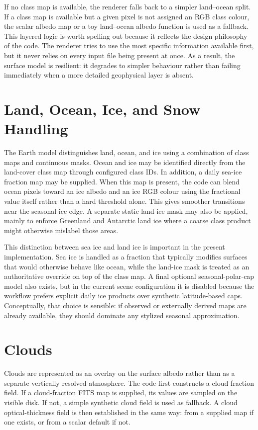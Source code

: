 \documentclass[12pt,a4paper]{article}
\begin{document}
If no class map is available, the renderer falls back to a simpler land--ocean split. If a class map is available but a given pixel is not assigned an RGB class colour, the scalar albedo map or a toy land--ocean albedo function is used as a fallback. This layered logic is worth spelling out because it reflects the design philosophy of the code. The renderer tries to use the most specific information available first, but it never relies on every input file being present at once. As a result, the surface model is resilient: it degrades to simpler behaviour rather than failing immediately when a more detailed geophysical layer is absent.

\section{Land, Ocean, Ice, and Snow Handling}
The Earth model distinguishes land, ocean, and ice using a combination of class maps and continuous masks. Ocean and ice may be identified directly from the land-cover class map through configured class IDs. In addition, a daily sea-ice fraction map may be supplied. When this map is present, the code can blend ocean pixels toward an ice albedo and an ice RGB colour using the fractional value itself rather than a hard threshold alone. This gives smoother transitions near the seasonal ice edge. A separate static land-ice mask may also be applied, mainly to enforce Greenland and Antarctic land ice where a coarse class product might otherwise mislabel those areas.

This distinction between sea ice and land ice is important in the present implementation. Sea ice is handled as a fraction that typically modifies surfaces that would otherwise behave like ocean, while the land-ice mask is treated as an authoritative override on top of the class map. A final optional seasonal-polar-cap model also exists, but in the current scene configuration it is disabled because the workflow prefers explicit daily ice products over synthetic latitude-based caps. Conceptually, that choice is sensible: if observed or externally derived maps are already available, they should dominate any stylized seasonal approximation.

\section{Clouds}
Clouds are represented as an overlay on the surface albedo rather than as a separate vertically resolved atmosphere. The code first constructs a cloud fraction field. If a cloud-fraction FITS map is supplied, its values are sampled on the visible disk. If not, a simple synthetic cloud field is used as fallback. A cloud optical-thickness field is then established in the same way: from a supplied map if one exists, or from a scalar default if not.
\end{document}
